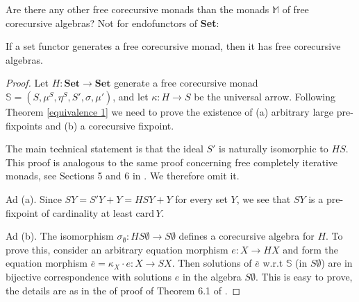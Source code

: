 \documentclass{LMCS}
\theoremstyle{plain}
\theoremstyle{definition}
\numberwithin{equation}{section}
\def\card{\mathrm{card}\,}
\def\emp{\emptyset}
\begin{document}
\noindent Are there any other free corecursive monads than the monads $\mathbb M$ of free corecursive algebras?
Not for endofunctors of {\bf Set}:

\begin{prop}
If a set functor generates a free corecursive monad, then it has free corecursive algebras.
\end{prop}

\begin{proof}

\sloppypar Let $H:\mathbf{ Set}\rightarrow \mathbf{ Set}$ generate a free corecursive monad $\mathbb S=(S,\mu^S,\eta^S, S',\sigma,\mu')$, and let $\kappa:H\rightarrow S$ be the universal arrow. Following Theorem \ref{equivalence 1} we need to prove the existence of (a) arbitrary large pre-fixpoints and (b) a corecursive fixpoint.

The main technical statement is that the ideal $S'$ is naturally
isomorphic to $HS$. This proof is analogous to the same proof
concerning free completely iterative monads, see Sections 5 and 6 in
\cite{aamv}. We therefore omit it.

Ad (a). Since $SY=S'Y+Y=HSY+Y$ for every set $Y$, we see that $SY$ is
a pre-fixpoint of cardinality at least $\card Y$.

Ad (b). The isomorphism $\sigma_{\emp}:HS\emp\rightarrow S\emp$
defines a corecursive algebra for $H$. To prove this, consider an
arbitrary equation morphism $e:X\rightarrow HX$ and form the equation
morphism $\overline e=\kappa_X\cdot e:X\rightarrow SX$. Then solutions of
$\overline e$ w.r.t $\mathbb S$ (in $S\emp$) are in bijective
correspondence with solutions $e$ in the algebra $S\emp$. This is easy
to prove, the details are as in the of proof of Theorem 6.1 of
\cite{m_cia}.
\end{proof}
\end{document}

